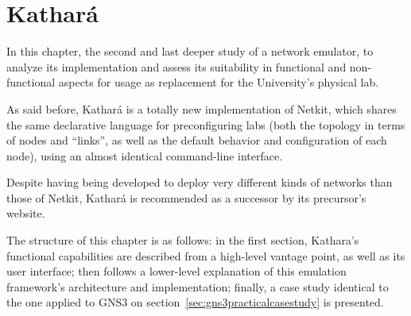 
\chapter{Kathará}
\label{ch:kathara}

In this chapter, the second and last deeper study of a network emulator, to analyze its implementation and assess its suitability in functional and non-functional aspects for usage as replacement for the University's physical lab.

As said before, Kathará is a totally new implementation of Netkit, which shares the same declarative language for preconfiguring labs (both the topology in terms of nodes and ``links'', as well as the default behavior and configuration of each node), using an almost identical command-line interface.

Despite having being developed to deploy very different kinds of networks than those of Netkit, Kathará is recommended as a successor by its precursor's website.

The structure of this chapter is as follows: in the first section, Kathara's functional capabilities are described from a high-level vantage point, as well as its user interface; then follows a lower-level explanation of this emulation framework's architecture and implementation; finally, a case study identical to the one applied to GNS3 on section~\ref{sec:gns3practicalcasestudy} is presented.







